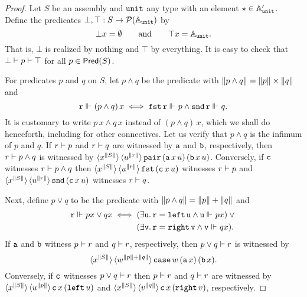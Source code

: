 \begin{proof}
  Let $S$ be an assembly and $\mathtt{unit}$ any type with an element
  ${\star} \in \mathbb{A}'_{\mathtt{unit}}$. Define the predicates $\bot, \top :
  S \to \mathcal{P}(\mathbb{A}_{\mathtt{unit}})$ by
  \begin{equation*}
    \bot x= \emptyset
    \qquad\text{and}\qquad
    \top x = \mathbb{A}_{\mathtt{unit}}.
  \end{equation*}
  That is, $\bot$ is realized by nothing and $\top$ by everything. It is
  easy to check that $\bot \vdash p \vdash \top$ for all $p \in
  \mathsf{Pred}(S)$.

  For predicates $p$ and $q$ on $S$, let $p \land q$ be the
  predicate with $\|p \land q\| = \|p\| \times
  \|q\|$ and
  \begin{equation*}
    \mathtt{r} \Vdash_{} (p \land q) \, x
    \iff
    \mathtt{fst}\,\mathtt{r} \Vdash_{} p \land \mathtt{snd}\,\mathtt{r} \Vdash_{} q.
  \end{equation*}
  It is customary to write $p \, x \land q \, x$ instead of $(p \land q) \, x$, which we shall do henceforth, including for other connectives.
  Let us verify that $p \land q$ is the infimum of $p$ and $q$. If $r \vdash p$ and
  $r \vdash q$ are witnessed by $\mathtt{a}$ and $\mathtt{b}$, respectively, then $r \vdash p \land q$
  is witnessed by $\langle x^{\|S\|} \rangle\, \langle u^{\|r\|} \rangle\, \mathtt{pair}\,(\mathtt{a}\,x\,u)\,(\mathtt{b}\,x\,u)$.
  Conversely, if $\mathtt{c}$ witnesses $r \vdash p \land q$ then
  $\langle x^{\|S\|} \rangle\, \langle u^{\|r\|} \rangle\, \mathtt{fst}\,(\mathtt{c}\,x\,u)$ witnesses $r \vdash p$ and $\langle x^{\|S\|} \rangle\, \langle u^{\|r\|} \rangle\, \mathtt{snd}\,(\mathtt{c}\,x\,u)$ witnesses $r \vdash q$.

  Next, define $p \lor q$ to be the predicate with $\|p \land q\| = \|p\| + \|q\|$ and
  \begin{equation*}
    \mathtt{r} \Vdash_{} p x \lor q x
    \iff
    \begin{aligned}[t]
      & (\exists \mathtt{u} .\, \mathtt{r} = \mathtt{left}\,\mathtt{u} \land \mathtt{u} \Vdash_{} p x)
      \lor {} \\
      & (\exists \mathtt{v} .\, \mathtt{r} = \mathtt{right}\,\mathtt{v} \land \mathtt{v} \Vdash_{} q x).
    \end{aligned}
  \end{equation*}
  If $\mathtt{a}$ and $\mathtt{b}$ witness $p \vdash r$ and $q \vdash r$, respectively, then
  $p \lor q \vdash r$ is witnessed by
  \begin{equation*}
    \langle x^{\|S\|} \rangle\, \langle w^{\|p\|+\|q\|} \rangle\,{
      \mathtt{case}\,w\,(\mathtt{a}\,x)\,(\mathtt{b}\,x)
    }.
  \end{equation*}
  Conversely, if $\mathtt{c}$ witnesses $p \lor q \vdash r$ then
  $p \vdash r$ and $q \vdash r$ are witnessed by
  $\langle x^{\|S\|} \rangle\, \langle u^{\|p\|} \rangle\,{\mathtt{c}\,x\,(\mathtt{left}\,u})$
  and
  $\langle x^{\|S\|} \rangle\, \langle v^{\|q\|} \rangle\,{\mathtt{c}\,x\,(\mathtt{right}\,v})$,
  respectively.


\end{proof}
